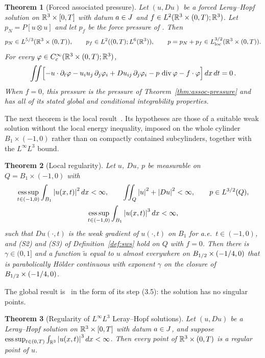 \documentclass[11pt,letterpaper]{article}
\numberwithin{equation}{section}
\theoremstyle{plain}
\newtheorem{theorem}{Theorem}[section]
\theoremstyle{definition}
\theoremstyle{remark}
\begin{document}
\begin{theorem}[Forced associated pressure]\label{thm:assoc-pressure-forced}
Let $(u,Du)$ be a forced Leray--Hopf solution on
$\mathbb{R}^3\times[0,T]$ with datum $a\in J$ and
$f\in L^2(\mathbb{R}^3\times(0,T);\mathbb{R}^3)$. Let
$p_N=P[u\otimes u]$ and let $p_f$ be the force pressure of
\cite[Lemma~13.1]{CKNLean}. Then
\[
 p_N\in L^{5/3}(\mathbb{R}^3\times(0,T)),\qquad
 p_f\in L^2((0,T);L^6(\mathbb{R}^3)),\qquad
 p=p_N+p_f\in L^{3/2}_{\mathrm{loc}}(\mathbb{R}^3\times(0,T)).
\]
For every $\varphi\in C_c^\infty(\mathbb{R}^3\times(0,T);\mathbb{R}^3)$,
\[
 \iint\Bigl[-u\cdot\partial_t\varphi-u_i u_j\,\partial_j\varphi_i
       +Du_{ij}\,\partial_j\varphi_i-p\,\operatorname{div}\varphi
       -f\cdot\varphi\Bigr]\,dx\,dt=0\,.
\]
When $f=0$, this pressure is the pressure of Theorem~\ref{thm:assoc-pressure}
and has all of its stated global and conditional integrability properties.
\end{theorem}


The next theorem is the local result~\cite[Theorem~1.4]{ESS2003}. Its
hypotheses are those of a suitable weak solution without the local energy
inequality, imposed on the whole cylinder $B_1\times(-1,0)$ rather than on
compactly contained subcylinders, together with the $L^\infty L^3$ bound.

\begin{theorem}[Local regularity]\label{thm:ess-local}
Let $u$, $Du$, $p$ be measurable on $Q=B_1\times(-1,0)$ with
\begin{gather*}
\operatorname*{ess\,sup}_{t\in(-1,0)}\int_{B_1}\left\lvert u(x,t)\right\rvert^2dx<\infty,\qquad
\iint_Q\left\lvert u\right\rvert^2+\left\lvert Du\right\rvert^2<\infty,\qquad
p\in L^{3/2}(Q),\\
\operatorname*{ess\,sup}_{t\in(-1,0)}\int_{B_1}\left\lvert u(x,t)\right\rvert^3dx<\infty ,
\end{gather*}
such that $Du(\cdot,t)$ is the weak gradient of $u(\cdot,t)$ on $B_1$ for a.e.\
$t\in(-1,0)$, and (S2) and (S3) of Definition~\ref{def:sws} hold on $Q$ with
$f=0$. Then there is $\gamma\in(0,1]$ and a function $\tilde u$ equal to $u$
almost everywhere on $B_{1/2}\times(-1/4,0)$ that is parabolically
H\"older continuous with exponent $\gamma$ on the closure of
$B_{1/2}\times(-1/4,0)$.
\end{theorem}

The global result is~\cite[Theorem~1.3]{ESS2003} in the form of its step
(3.5): the solution has no singular points.

\begin{theorem}[Regularity of $L^\infty L^3$ Leray--Hopf solutions]\label{thm:ess-global}
Let $(u,Du)$ be a Leray--Hopf solution on $\mathbb{R}^3\times[0,T]$ with datum
$a\in J$, and suppose
$\operatorname*{ess\,sup}_{t\in(0,T)}\int_{\mathbb{R}^3}\left\lvert u(x,t)\right\rvert^3dx<\infty$. Then every point of
$\mathbb{R}^3\times(0,T)$ is a regular point of $u$.
\end{theorem}
\end{document}
